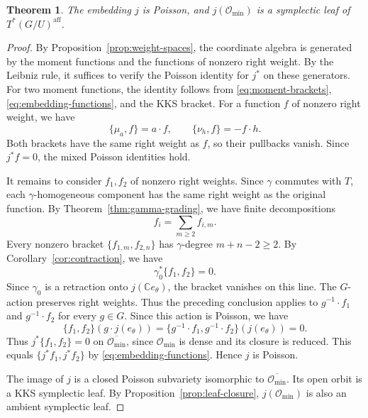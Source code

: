 \documentclass[12pt]{article}
\theoremstyle{paperplain}
\newtheorem{theorem}{Theorem}[section]
\theoremstyle{paperdefinition}
\newcommand{\C}{\mathbb C}
\newcommand{\Omin}{\mathcal O_{\min}}
\begin{document}
\newpage
\setlength{\abovedisplayskip}{12pt plus 2pt minus 2pt}
\setlength{\belowdisplayskip}{12pt plus 2pt minus 2pt}
\setlength{\abovedisplayshortskip}{0pt plus 2pt}
\setlength{\belowdisplayshortskip}{10pt plus 2pt minus 2pt}
\begin{theorem}\label{thm:minimal-orbit-leaf}
    The embedding $j$ is Poisson, and $j(\Omin)$ is a symplectic leaf of $T^*(G/U)^{\mathrm{aff}}$.
\end{theorem}

\begin{proof}
    By Proposition~\ref{prop:weight-spaces}, the coordinate algebra is generated by the moment functions and the functions of nonzero right weight. By the Leibniz rule, it suffices to verify the Poisson identity for $j^*$ on these generators. For two moment functions, the identity follows from \eqref{eq:moment-brackets}, \eqref{eq:embedding-functions}, and the KKS bracket. For a function $f$ of nonzero right weight, we have
    $$
        \{\mu_a,f\}=a\cdot f,\qquad
        \{\nu_h,f\}=-f\cdot h.
    $$
    Both brackets have the same right weight as $f$, so their pullbacks vanish. Since $j^*f=0$, the mixed Poisson identities hold.

    It remains to consider $f_1,f_2$ of nonzero right weights. Since $\gamma$ commutes with $T$, each $\gamma$-homogeneous component has the same right weight as the original function. By Theorem~\ref{thm:gamma-grading}, we have finite decompositions
    $$
        f_i=\sum_{m\ge2}f_{i,m}.
    $$
    Every nonzero bracket $\{f_{1,m},f_{2,n}\}$ has $\gamma$-degree $m+n-2\ge2$. By Corollary~\ref{cor:contraction}, we have
    $$
        \gamma_0^*\{f_1,f_2\}=0.
    $$
    Since $\gamma_0$ is a retraction onto $j(\C e_\theta)$, the bracket vanishes on this line.
    The $G$-action preserves right weights. Thus the preceding conclusion applies to $g^{-1}\cdot f_1$ and $g^{-1}\cdot f_2$ for every $g\in G$. Since this action is Poisson, we have
    $$
        \{f_1,f_2\}(g\cdot j(e_\theta))
        =\{g^{-1}\cdot f_1,g^{-1}\cdot f_2\}(j(e_\theta))=0.
    $$
    Thus $j^*\{f_1,f_2\}=0$ on $\overline{\Omin}$, since $\Omin$ is dense and its closure is reduced. This equals $\{j^*f_1,j^*f_2\}$ by \eqref{eq:embedding-functions}. Hence $j$ is Poisson.

    The image of $j$ is a closed Poisson subvariety isomorphic to $\overline{\Omin}$. Its open orbit is a KKS symplectic leaf. By Proposition~\ref{prop:leaf-closure}, $j(\Omin)$ is also an ambient symplectic leaf.
\end{proof}
\end{document}
